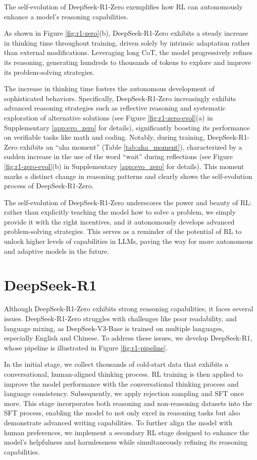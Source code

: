 The self-evolution of DeepSeek-R1-Zero exemplifies how RL can autonomously enhance a model’s reasoning capabilities. 

As shown in Figure \ref{fig:r1-zero}(b), DeepSeek-R1-Zero exhibits a steady increase in thinking time throughout training, driven solely by intrinsic adaptation rather than external modifications. Leveraging long CoT, the model progressively refines its reasoning, generating hundreds to thousands of tokens to explore and improve its problem-solving strategies.  

The increase in thinking time fosters the autonomous development of sophisticated behaviors. Specifically, DeepSeek-R1-Zero increasingly exhibits advanced reasoning strategies such as reflective reasoning and systematic exploration of alternative solutions (see Figure \ref{fig:r1-zero-evol}(a) in Supplementary \ref{app:evo_zero} for details), significantly boosting its performance on verifiable tasks like math and coding. Notably, during training, DeepSeek-R1-Zero exhibits an ``aha moment'' (Table \ref{tab:aha_moment}), characterized by a sudden increase in the use of the word ``wait'' during reflections (see Figure \ref{fig:r1-zero-evol}(b) in Supplementary \ref{app:evo_zero} for details). This moment marks a distinct change in reasoning patterns and clearly shows the self-evolution process of DeepSeek-R1-Zero.

The self-evolution of DeepSeek-R1-Zero underscores the power and beauty of RL: rather than explicitly teaching the model how to solve a problem, we simply provide it with the right incentives, and it autonomously develops advanced problem-solving strategies. This serves as a reminder of the potential of RL to unlock higher levels of capabilities in LLMs, paving the way for more autonomous and adaptive models in the future.

\section{DeepSeek-R1}

\label{sec:ds-r1}

Although DeepSeek-R1-Zero exhibits strong reasoning capabilities, it faces several issues.  DeepSeek-R1-Zero struggles with challenges like poor readability, and language mixing, as DeepSeek-V3-Base is trained on multiple languages, especially English and Chinese. To address these issues, we develop DeepSeek-R1, whose pipeline is illustrated in Figure \ref{fig:r1-pipeline}.

In the initial stage, we collect thousands of cold-start data that exhibits a conversational, human-aligned thinking process. RL training is then applied to improve the model performance with the conversational thinking process and language consistency. Subsequently, we apply rejection sampling and SFT once more. This stage incorporates both reasoning and non-reasoning datasets into the SFT process, enabling the model to not only excel in reasoning tasks but also demonstrate advanced writing capabilities. To further align the model with human preferences, we implement a secondary RL stage designed to enhance the model's helpfulness and harmlessness while simultaneously refining its reasoning capabilities. 

